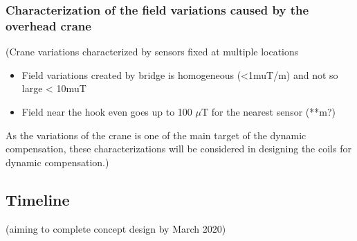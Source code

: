 \subsubsection*{Characterization of the field variations caused by the overhead crane}
(Crane variations characterized by sensors fixed at multiple locations
\begin{itemize}
    \item Field variations created by bridge is homogeneous (<1muT/m) and not so large < 10muT
    \item Field near the hook even goes up to 100 $\mu$T for the nearest sensor (**m?)
\end{itemize}
As the variations of the crane is one of the main target of the dynamic compensation, these characterizations will be considered in designing the coils for dynamic compensation.)




\subsection{Timeline}
(aiming to complete concept design by March 2020)




